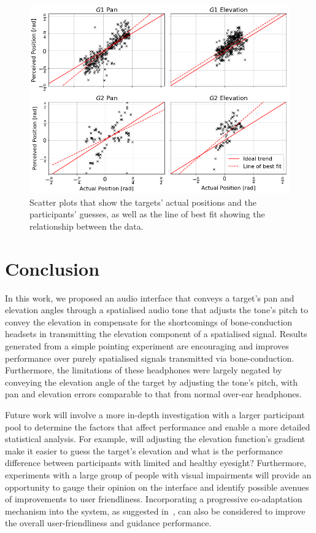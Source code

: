 \documentclass{llncs}
\begin{document}
\begin{figure}[t]
  \centering
  \includegraphics[width=1.0\columnwidth]{figures/correlation.png}
  \caption{Scatter plots that show the targets' actual positions and the participants' guesses, as well as the line of best fit showing the relationship between the data. }\label{fig:correlation-results}
\end{figure}

\section{Conclusion}\label{sec:conclusion}

In this work, we proposed an audio interface that conveys a target's pan and elevation angles through a spatialised audio tone that adjusts the tone's pitch to convey the elevation in compensate for the shortcomings of bone-conduction headsets in transmitting the elevation component of a spatialised signal.
Results generated from a simple pointing experiment are encouraging and improves performance over purely spatialised signals transmitted via bone-conduction.
Furthermore, the limitations of these headphones were largely negated by conveying the elevation angle of the target by adjusting the tone's pitch, with pan and elevation errors comparable to that from normal over-ear headphones.

Future work will involve a more in-depth investigation with a larger participant pool to determine the factors that affect performance and enable a more detailed statistical analysis.
For example, will adjusting the elevation function's gradient make it easier to guess the target's elevation and what is the performance difference between participants with limited and healthy eyesight?  
Furthermore, experiments with a large group of people with visual impairments will provide an opportunity to gauge their opinion on the interface and identify possible avenues of improvements to user friendliness.
Incorporating a progressive co-adaptation mechanism into the system, as suggested in~\cite{gallina2015progressive}, can also be considered to improve the overall user-friendliness and guidance performance.



\end{document}
